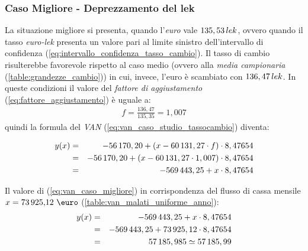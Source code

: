 \subsubsection[Caso Migliore - Deprezzamento del lek]{Caso Migliore - Deprezzamento del lek}
\label{sec:cambio_favorevole}
La situazione migliore si presenta, quando l'\emph{euro} vale $135,53 \thinspace lek$, ovvero quando il tasso \emph{euro-lek} presenta un valore pari al limite sinistro dell'intervallo di confidenza (\ref{eq:intervallo_confidenza_tasso_cambio}). Il tasso di cambio risulterebbe favorevole rispetto al caso medio (ovvero alla \textit{media campionaria} (\ref{table:grandezze_cambio})) in cui, invece, l'euro è scambiato con $136,47 \thinspace lek$.\newline
In queste condizioni il valore del \textit{fattore di aggiustamento}  (\ref{eq:fattore_aggiustamento}) è uguale a:
\begin{equation}
\label{eq:fattore_aggiustamento_caso_migliore}
\begin{split}
f = \frac{136,47}{135,35} = 1,007
\end{split}
\end{equation}
quindi la formula del \emph{\ac{VAN}} (\ref{eq:van_caso_studio_tassocambio}) diventa:

\begin{eqnarray}
\label{eq:van_caso_migliore}
 		y(x) & = & -56\thinspace 170,20 + (x - 60\thinspace 131,27 \cdot f) \cdot 8,47654 \nonumber \\
 			 & = & -56\thinspace 170,20 + (x - 60\thinspace 131,27 \cdot 1,007) \cdot 8,47654 \nonumber \\
 			 & = & -569\thinspace 443,25 + x \cdot 8,47654
\end{eqnarray}

Il valore di (\ref{eq:van_caso_migliore}) in corrispondenza del flusso di cassa mensile $ x = \mbox{73\thinspace 925,12 \euro}$ (\ref{table:van_malati_uniforme_anno}):
\begin{eqnarray}
\label{eq:van_flusso_cassa_malati_uniforme_caso_migliore}
 		y(x) & = & -569\thinspace 443,25 + x \cdot 8,47654 \nonumber \\
 			 & = & -569\thinspace 443,25 + 73\thinspace 925,12 \cdot 8,47654 \nonumber \\
 			 & = & 57\thinspace 185,985 \simeq 57\thinspace 185,99
\end{eqnarray}

